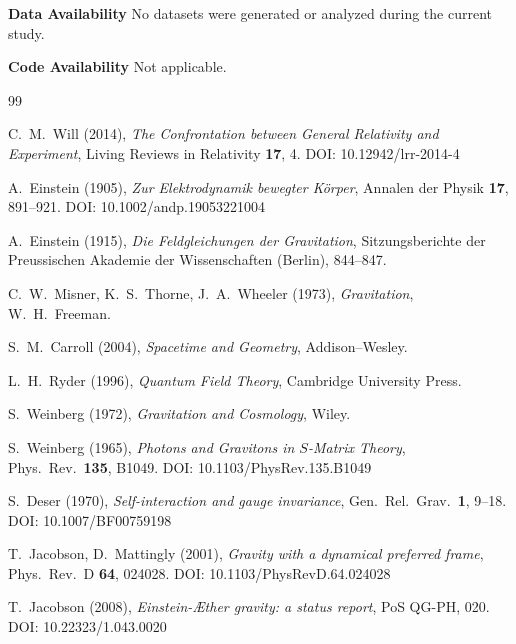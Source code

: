 \documentclass[11pt]{article}
\begin{document}
    \textbf{Data Availability} No datasets were generated or analyzed during the current study.
    
    \textbf{Code Availability} Not applicable.

    \begin{thebibliography}{99}

        C.~M.~Will (2014),
        \textit{The Confrontation between General Relativity and Experiment},
        Living Reviews in Relativity \textbf{17}, 4.
        DOI: 10.12942/lrr-2014-4

        A.~Einstein (1905),
        \textit{Zur Elektrodynamik bewegter Körper},
        Annalen der Physik \textbf{17}, 891--921.
        DOI: 10.1002/andp.19053221004

        A.~Einstein (1915),
        \textit{Die Feldgleichungen der Gravitation},
        Sitzungsberichte der Preussischen Akademie der Wissenschaften (Berlin), 844--847.

        C.~W.~Misner, K.~S.~Thorne, J.~A.~Wheeler (1973),
        \textit{Gravitation},
        W.~H.~Freeman.

        S.~M.~Carroll (2004),
        \textit{Spacetime and Geometry},
        Addison--Wesley.

        L.~H.~Ryder (1996),
        \textit{Quantum Field Theory},
        Cambridge University Press.

        S.~Weinberg (1972),
        \textit{Gravitation and Cosmology},
        Wiley.

        S.~Weinberg (1965),
        \textit{Photons and Gravitons in $S$-Matrix Theory},
        Phys.\ Rev.\ \textbf{135}, B1049.
        DOI: 10.1103/PhysRev.135.B1049

        S.~Deser (1970),
        \textit{Self-interaction and gauge invariance},
        Gen.\ Rel.\ Grav.\ \textbf{1}, 9--18.
        DOI: 10.1007/BF00759198

        T.~Jacobson, D.~Mattingly (2001),
        \textit{Gravity with a dynamical preferred frame},
        Phys.\ Rev.\ D \textbf{64}, 024028.
        DOI: 10.1103/PhysRevD.64.024028

        T.~Jacobson (2008),
        \textit{Einstein-\AE ther gravity: a status report},
        PoS QG-PH, 020.
        DOI: 10.22323/1.043.0020


\end{thebibliography}
\end{document}
